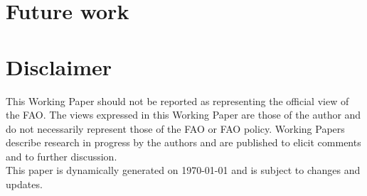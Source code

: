 \documentclass[nojss]{jss}
\begin{document}
\newpage
\section{Future work}


\section*{Disclaimer}
This Working Paper should not be reported as representing the official view of
the FAO. The views expressed in this Working Paper are those of the
author and do not necessarily represent those of the FAO or FAO
policy. Working Papers describe research in progress by the authors and
are published to elicit comments and to further discussion.\\

This paper is dynamically generated on \today{} and is subject to
changes and updates.
\end{document}

